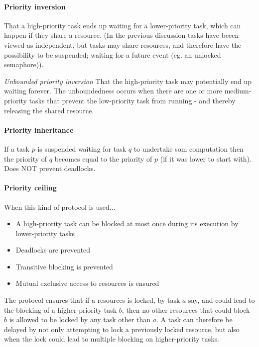 \paragraph{Priority inversion} That a high-priority task ends up waiting for a lower-priority task, which can happen if they share a resource. (In the previous discussion tasks have beeen viewed as independent, but tasks may share resources, and therefore have the possibility to be suspended; waiting for a future event (eg. an unlocked semaphore)).

\textit{Unbounded priority inversion} That the high-priority task may potentially end up waiting forever. The unboundedness occurs when there are one or more medium-priority tasks that prevent the low-priority task from running - and thereby releasing the shared resource.

\paragraph{Priority inheritance} If a task $p$ is suspended waiting for task $q$ to undertake som computation then the priority of $q$ becomes equal to the priority of $p$ (if it was lower to start with). Does NOT prevent deadlocks.

\paragraph{Priority ceiling} When this kind of protocol is used...
\begin{itemize}
  \item A high-priority task can be blocked at most once during its execution by lower-priority tasks
  \item Deadlocks are prevented
  \item Transitive blocking is prevented
  \item Mutual exclusive access to resources is ensured
\end{itemize}

The protocol ensures that if a resources is locked, by task $a$ say, and could lead to the blocking of a higher-priority task $b$, then no other resources that could block $b$ is allowed to be locked by any task other than $a$. A task can therefore be delayed by not only attempting to lock a previously locked resource, but also when the lock could lead to multiple blocking on higher-priority tasks.

